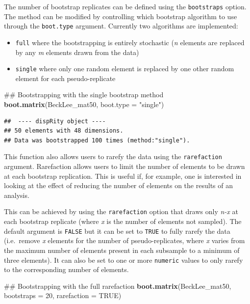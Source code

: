 \documentclass[]{book}
\newenvironment{Shaded}{\begin{snugshade}}{\end{snugshade}}
\newcommand{\KeywordTok}[1]{\textcolor[rgb]{0.13,0.29,0.53}{\textbf{#1}}}
\newcommand{\DataTypeTok}[1]{\textcolor[rgb]{0.13,0.29,0.53}{#1}}
\newcommand{\DecValTok}[1]{\textcolor[rgb]{0.00,0.00,0.81}{#1}}
\newcommand{\StringTok}[1]{\textcolor[rgb]{0.31,0.60,0.02}{#1}}
\newcommand{\OtherTok}[1]{\textcolor[rgb]{0.56,0.35,0.01}{#1}}
\newcommand{\NormalTok}[1]{#1}
\providecommand{\tightlist}{%
  \setlength{\itemsep}{0pt}\setlength{\parskip}{0pt}}
\theoremstyle{definition}
\theoremstyle{definition}
\theoremstyle{remark}
\begin{document}
The number of bootstrap replicates can be defined using the
\texttt{bootstraps} option. The method can be modified by controlling
which bootstrap algorithm to use through the \texttt{boot.type}
argument. Currently two algorithms are implemented:

\begin{itemize}
\tightlist
\item
  \texttt{full} where the bootstrapping is entirely stochastic (\emph{n}
  elements are replaced by any \emph{m} elements drawn from the data)
\item
  \texttt{single} where only one random element is replaced by one other
  random element for each pseudo-replicate
\end{itemize}

\begin{Shaded}
\begin{Highlighting}[]
\NormalTok{## Bootstrapping with the single bootstrap method}
\KeywordTok{boot.matrix}\NormalTok{(BeckLee_mat50, }\DataTypeTok{boot.type =} \StringTok{"single"}\NormalTok{)}
\end{Highlighting}
\end{Shaded}

\begin{verbatim}
##  ---- dispRity object ---- 
## 50 elements with 48 dimensions.
## Data was bootstrapped 100 times (method:"single").
\end{verbatim}

This function also allows users to rarefy the data using the
\texttt{rarefaction} argument. Rarefaction allows users to limit the
number of elements to be drawn at each bootstrap replication. This is
useful if, for example, one is interested in looking at the effect of
reducing the number of elements on the results of an analysis.

This can be achieved by using the \texttt{rarefaction} option that draws
only \emph{n-x} at each bootstrap replicate (where \emph{x} is the
number of elements not sampled). The default argument is \texttt{FALSE}
but it can be set to \texttt{TRUE} to fully rarefy the data (i.e.~remove
\emph{x} elements for the number of pseudo-replicates, where \emph{x}
varies from the maximum number of elements present in each subsample to
a minimum of three elements). It can also be set to one or more
\texttt{numeric} values to only rarefy to the corresponding number of
elements.

\begin{Shaded}
\begin{Highlighting}[]
\NormalTok{## Bootstrapping with the full rarefaction}
\KeywordTok{boot.matrix}\NormalTok{(BeckLee_mat50, }\DataTypeTok{bootstraps =} \DecValTok{20}\NormalTok{, }\DataTypeTok{rarefaction =} \OtherTok{TRUE}\NormalTok{)}
\end{Highlighting}
\end{Shaded}
\end{document}
